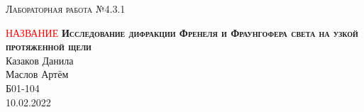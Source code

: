\documentclass[12pt,a4paper]{extreport}
\begin{document}
	
	\begin{center}
		\large
		\textsc{Лабораторная работа №4.3.1}
		
		\Huge
		\textsc{\textcolor{red}{НАЗВАНИЕ}
		\LARGE
		\textbf{Исследование дифракции Френеля и Фраунгофера света на узкой протяженной щели}}
		\\[5mm]

		\large
		Казаков Данила \\
		Маслов Артём \\
		Б01-104
		\\[3mm]
		10.02.2022
	\end{center}
			
	
	
	

	
	
	

	
	
	
	
	
	
\end{document}
